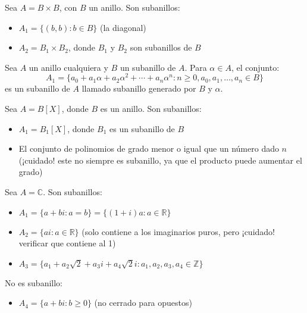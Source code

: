 \begin{example}{}{}
    Sea \(A = B \times B\), con \(B\) un anillo. Son subanillos:
    \begin{itemize}
        \item \(A_1 = \{(b, b) : b \in B\}\) (la diagonal)
        \item \(A_2 = B_1 \times B_2\), donde \(B_1\) y \(B_2\) son subanillos de \(B\)
    \end{itemize}
\end{example}

\begin{example}{}{}
    Sea \(A\) un anillo cualquiera y \(B\) un subanillo de \(A\). Para \(\alpha \in A\), el conjunto:
    \[
    A_1 = \{a_0 + a_1\alpha + a_2\alpha^2 + \cdots + a_n\alpha^n : n \geq 0, a_0, a_1, \ldots, a_n \in B\}
    \]
    es un subanillo de \(A\) llamado {subanillo generado por \(B\) y \(\alpha\)}.
\end{example}

\begin{example}{}{}
    Sea \(A = B[X]\), donde \(B\) es un anillo. Son subanillos:
    \begin{itemize}
        \item \(A_1 = B_1[X]\), donde \(B_1\) es un subanillo de \(B\)
        \item El conjunto de polinomios de grado menor o igual que un número dado \(n\) (¡cuidado! este no siempre es subanillo, ya que el producto puede aumentar el grado)
    \end{itemize}
\end{example}

\begin{example}{}{}
    Sea \(A = \mathbb{C}\). Son subanillos:
    \begin{itemize}
        \item \(A_1 = \{a + bi : a = b\} = \{(1+i)a : a \in \mathbb{R}\}\)
        \item \(A_2 = \{ai : a \in \mathbb{R}\}\) (solo contiene a los imaginarios puros, pero ¡cuidado! verificar que contiene al 1)
        \item \(A_3 = \{a_1 + a_2\sqrt{2} + a_3i + a_4\sqrt{2}i : a_1, a_2, a_3, a_4 \in \mathbb{Z}\}\)
    \end{itemize}
    
    No es subanillo:
    \begin{itemize}
        \item \(A_4 = \{a + bi : b \geq 0\}\) (no cerrado para opuestos)
    \end{itemize}
\end{example}

